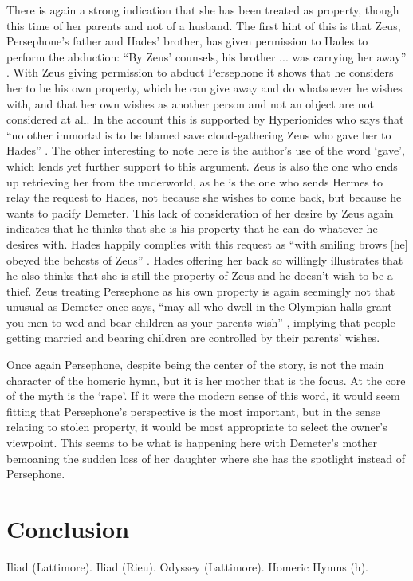 \documentclass[11pt]{article}
\begin{document}
There is again a strong indication that she has been treated as property, though this time of her parents and not of a husband.
The first hint of this is that Zeus, Persephone's father and Hades' brother, has given permission to Hades to perform the abduction: ``By Zeus' counsels, his brother ... was carrying her away'' \cite[line 30]{persephone}.
With Zeus giving permission to abduct Persephone it shows that he considers her to be his own property, which he can give away and do whatsoever he wishes with, and that her own wishes as another person and not an object are not considered at all.
In the account this is supported by Hyperionides who says that ``no other immortal is to be blamed save cloud-gathering Zeus who gave her to Hades'' \cite[line 78]{persephone}.
The other interesting to note here is the author's use of the word `gave', which lends yet further support to this argument.
Zeus is also the one who ends up retrieving her from the underworld, as he is the one who sends Hermes to relay the request to Hades, not because she wishes to come back, but because he wants to pacify Demeter.
This lack of consideration of her desire by Zeus again indicates that he thinks that she is his property that he can do whatever he desires with.
Hades happily complies with this request as ``with smiling brows [he] obeyed the behests of Zeus'' \cite[line 388]{persephone}.
Hades offering her back so willingly illustrates that he also thinks that she is still the property of Zeus and he doesn't wish to be a thief.
Zeus treating Persephone as his own property is again seemingly not that unusual as Demeter once says, 
``may all who dwell in the Olympian halls grant you men to wed and bear children as your parents wish'' \cite[line 136]{persephone}, implying that people getting married and bearing children are controlled by their parents' wishes.

Once again Persephone, despite being the center of the story, is not the main character of the homeric hymn, but it is her mother that is the focus.
At the core of the myth is the `rape'.
If it were the modern sense of this word, it would seem fitting that Persephone's perspective is the most important, but in the sense relating to stolen property, it would be most appropriate to select the owner's viewpoint.
This seems to be what is happening here with Demeter's mother bemoaning the sudden loss of her daughter where she has the spotlight instead of Persephone.


\section{Conclusion}


\newpage

\begin{thebibliography}{9}
		Iliad (Lattimore).
		Iliad (Rieu).
		Odyssey (Lattimore).
		Homeric Hymns (h).
\end{thebibliography}
\end{document}
